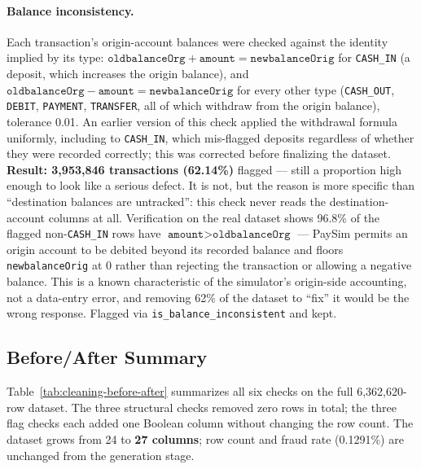 \paragraph{Balance inconsistency.} Each transaction's origin-account balances were checked against the identity implied by its type: \(\texttt{oldbalanceOrg} + \texttt{amount} = \texttt{newbalanceOrig}\) for \texttt{CASH\_IN} (a deposit, which increases the origin balance), and \(\texttt{oldbalanceOrg} - \texttt{amount} = \texttt{newbalanceOrig}\) for every other type (\texttt{CASH\_OUT}, \texttt{DEBIT}, \texttt{PAYMENT}, \texttt{TRANSFER}, all of which withdraw from the origin balance), tolerance 0.01. An earlier version of this check applied the withdrawal formula uniformly, including to \texttt{CASH\_IN}, which mis-flagged deposits regardless of whether they were recorded correctly; this was corrected before finalizing the dataset. \textbf{Result: 3,953,846 transactions (62.14\%)} flagged --- still a proportion high enough to look like a serious defect. It is not, but the reason is more specific than ``destination balances are untracked'': this check never reads the destination-account columns at all. Verification on the real dataset shows 96.8\% of the flagged non-\texttt{CASH\_IN} rows have \(\texttt{amount} > \texttt{oldbalanceOrg}\) --- PaySim permits an origin account to be debited beyond its recorded balance and floors \texttt{newbalanceOrig} at 0 rather than rejecting the transaction or allowing a negative balance. This is a known characteristic of the simulator's origin-side accounting, not a data-entry error, and removing 62\% of the dataset to ``fix'' it would be the wrong response. Flagged via \texttt{is\_balance\_inconsistent} and kept.

\subsection{Before/After Summary}
\label{subsec:before-after-summary}

Table~\ref{tab:cleaning-before-after} summarizes all six checks on the full 6,362,620-row dataset. The three structural checks removed zero rows in total; the three flag checks each added one Boolean column without changing the row count. The dataset grows from 24 to \textbf{27 columns}; row count and fraud rate (0.1291\%) are unchanged from the generation stage.

